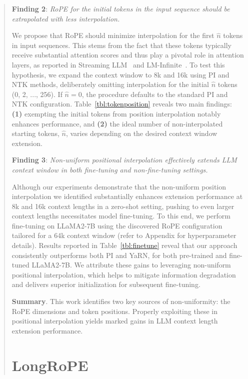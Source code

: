 \begin{abstract}
\textbf{Finding 2}: \textit{RoPE for the initial tokens in the input sequence should be extrapolated with less interpolation.} 

We propose that RoPE should minimize interpolation for the first $\hat{n}$ tokens in input sequences. This stems from the fact that these tokens typically receive substantial attention scores and thus play a pivotal role in attention layers, as reported in Streaming LLM~\cite{streamingllm} and LM-Infinite~\cite{han2023lminfinite}. To test this hypothesis, we expand the context window to 8k and 16k using PI and NTK methods, deliberately omitting interpolation for the initial $\hat n$ tokens (0, 2, ..., 256). If $\hat n = 0$, the procedure defaults to the standard PI and NTK configuration. Table~\ref{tbl:tokenposition} reveals two main findings: \textbf{(1)} exempting the initial tokens from position interpolation notably enhances performance, and \textbf{(2)} the ideal number of non-interpolated starting tokens, $\hat n$, varies depending on the desired context window extension.

\textbf{Finding 3}: \textit{Non-uniform positional interpolation effectively extends LLM context window in both fine-tuning and non-fine-tuning settings.} 

Although our experiments demonstrate that the non-uniform position interpolation we identified substantially enhances extension performance at 8k and 16k context lengths in a zero-shot setting, pushing to even larger context lengths necessitates model fine-tuning. To this end, we perform fine-tuning on LLaMA2-7B using the discovered RoPE configuration tailored for a 64k context window (refer to Appendix for hyperparameter details). Results reported in Table~\ref{tbl:finetune} reveal that our approach consistently outperforms both PI and YaRN, for both pre-trained and fine-tuned LLaMA2-7B. We attribute these gains to leveraging non-uniform positional interpolation, which helps to mitigate information degradation and delivers superior initialization for subsequent fine-tuning.

\textbf{Summary}. This work identifies two key sources of non-uniformity: the RoPE dimensions and token positions. Properly exploiting these in positional interpolation yields marked gains in LLM context length extension performance.

\section{LongRoPE}


\end{abstract}
